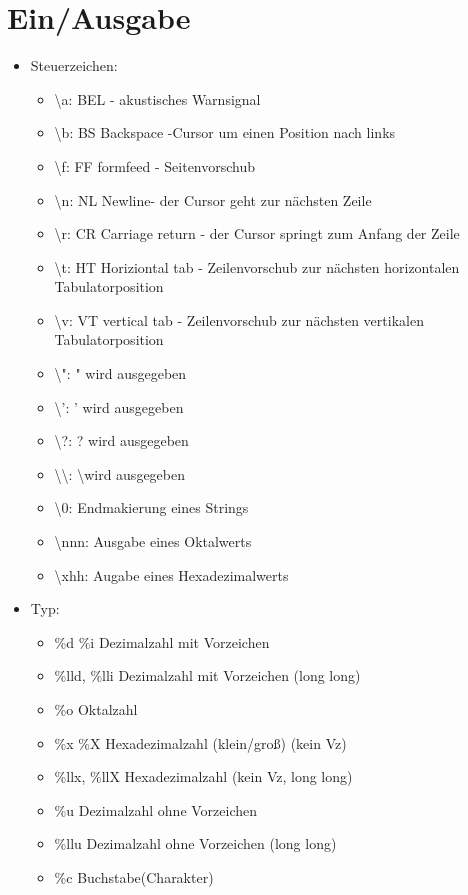 \documentclass[10pt,a5paper]{report}
\begin{document}
\section{Ein/Ausgabe}
\begin{itemize}
\item Steuerzeichen:\begin{itemize}
 \item \textbackslash a: BEL - akustisches Warnsignal
 \item \textbackslash b: BS Backspace -Cursor um einen Position nach links
 \item \textbackslash f: FF formfeed - Seitenvorschub
 \item \textbackslash n: NL Newline- der Cursor geht zur nächsten Zeile
 \item \textbackslash r: CR Carriage return - der Cursor springt zum Anfang der Zeile
 \item \textbackslash t: HT Horiziontal tab - Zeilenvorschub zur nächsten 
 horizontalen Tabulatorposition
 \item \textbackslash v: VT vertical tab - Zeilenvorschub zur nächsten 
 vertikalen Tabulatorposition
 \item \textbackslash ": " wird ausgegeben
 \item \textbackslash ': ' wird ausgegeben
 \item \textbackslash ?: ? wird ausgegeben
 \item \textbackslash \textbackslash: \textbackslash wird ausgegeben
 \item \textbackslash 0: Endmakierung eines Strings
 \item \textbackslash nnn: Ausgabe eines Oktalwerts
 \item \textbackslash xhh: Augabe eines Hexadezimalwerts
\end{itemize}\newpage
\item Typ: \begin{itemize}
\item \%d \%i Dezimalzahl mit Vorzeichen
\item \%lld, \%lli Dezimalzahl mit Vorzeichen (long long)
\item \%o Oktalzahl
\item \%x \%X Hexadezimalzahl (klein/groß) (kein Vz)
\item \%llx, \%llX Hexadezimalzahl (kein Vz, long long)
\item \%u Dezimalzahl ohne Vorzeichen
\item \%llu Dezimalzahl ohne Vorzeichen (long long)
\item \%c Buchstabe(Charakter)

\end{itemize}
\end{itemize}
\end{document}
